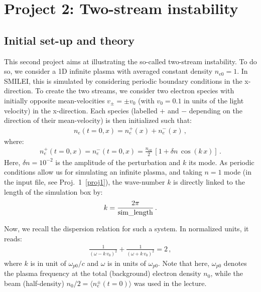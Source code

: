 \documentclass[10pt]{article}
\begin{document}
\newpage
\section{Project 2: Two-stream instability}\label{proj2}

\subsection{Initial set-up and theory}

This second project aims at illustrating the so-called two-stream instability.
To do so, we consider a 1D infinite plasma with averaged constant density $n_{e0} = 1$. 
In SMILEI, this is simulated by considering periodic boundary conditions in the x-direction. 
To create the two streams, we consider two electron species with initially opposite mean-velocities $v_{\pm} = \pm v_0$ (with $v_0 = 0.1$ in units of the light velocity) in the x-direction.
Each species (labelled $+$ and $-$ depending on the direction of their mean-velocity) is then initialized such that:
\begin{eqnarray}\label{eq_2stream1}
n_e(t=0,x) = n_e^+(x) + n_e^-(x)\,,
\end{eqnarray}
where:
\begin{eqnarray}\label{eq_2stream2}
n_e^+(t=0,x) = n_e^-(t=0,x) = \frac{n_{e0}}{2}\,[1 + \delta n\,\cos(k\,x)]\,.
\end{eqnarray}
Here, $\delta n = 10^{-2}$ is the amplitude of the perturbation and $k$ its mode.
As periodic conditions allow us for simulating an infinite plasma, and taking $n=1$ mode  (in the input file, see Proj.~1~\ref{proj1}), the wave-number $k$ is directly linked to the length of the simulation box by:
\begin{eqnarray}\label{eq_k}
k = \frac{2\pi}{\rm sim\_length}\,.
\end{eqnarray}

Now, we recall the dispersion relation for such a system. In normalized units, it reads:
\begin{eqnarray}\label{eq_disprel_2stream}
\frac{1}{(\omega - k\,v_0)^2} + \frac{1}{(\omega + k\,v_0)^2} = 2\,,
\end{eqnarray}
where $k$ is in unit of $\omega_{p0}/c$ and $\omega$ is in units of $\omega_{p0}$.
Note that here, $\omega_{p0}$ denotes the plasma frequency at the total (background) electron density $n_0$, while the beam (half-density) $n_0/2 = \langle n_e^{\pm}(t=0) \rangle$ was used in the lecture.
\end{document}
